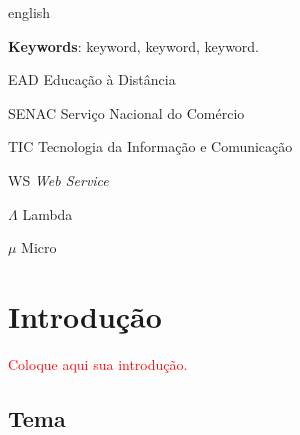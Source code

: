 \documentclass[]{senac-tcc}
\begin{document}
\begin{resumo}[Abstract]
 \begin{otherlanguage*}{english}
   \lipsum[1] %

   \vspace{\onelineskip}
 
   \noindent 
   \textbf{Keywords}: keyword, keyword, keyword.
 \end{otherlanguage*}
\end{resumo}

\listoffigures*
\cleardoublepage

\listoftables*
\cleardoublepage

\begin{siglas}
  \item[EAD] Educação à Distância
  \item[SENAC] Serviço Nacional do Comércio
  \item[TIC] Tecnologia da Informação e Comunicação
  \item[WS] \textit{Web Service}
\end{siglas}

\begin{simbolos}
  \item[$ \Lambda $] Lambda
  \item[$ \mu $] Micro
\end{simbolos}

\tableofcontents*
\cleardoublepage



\textual

\chapter[Introdução]{Introdução}

\textcolor{red}{Coloque aqui sua introdução.} \lipsum[2]

\section{Tema}
\end{document}
